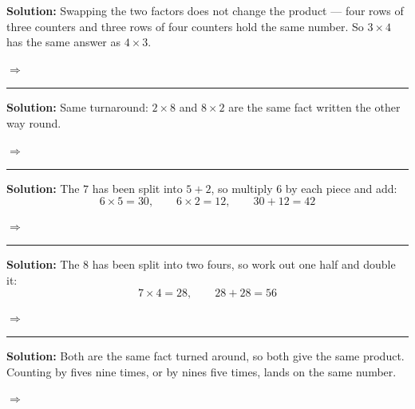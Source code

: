 \documentclass[12pt]{article}
\begin{document}




\textbf{Solution:} Swapping the two factors does not change the product --- four rows of three counters and three rows of four counters hold the same number. So $3 \times 4$ has the same answer as $4 \times 3$.

$\Rightarrow$ 

\vspace{0.15cm}\noindent\rule{\linewidth}{0.2pt}


\textbf{Solution:} Same turnaround: $2 \times 8$ and $8 \times 2$ are the same fact written the other way round.

$\Rightarrow$ 

\vspace{0.15cm}\noindent\rule{\linewidth}{0.2pt}


\textbf{Solution:} The $7$ has been split into $5 + 2$, so multiply $6$ by each piece and add:
\[ 6 \times 5 = 30, \qquad 6 \times 2 = 12, \qquad 30 + 12 = 42 \]

$\Rightarrow$ 

\vspace{0.15cm}\noindent\rule{\linewidth}{0.2pt}


\textbf{Solution:} The $8$ has been split into two fours, so work out one half and double it:
\[ 7 \times 4 = 28, \qquad 28 + 28 = 56 \]

$\Rightarrow$ 

\vspace{0.15cm}\noindent\rule{\linewidth}{0.2pt}


\textbf{Solution:} Both are the same fact turned around, so both give the same product. Counting by fives nine times, or by nines five times, lands on the same number.

$\Rightarrow$ 
\end{document}
